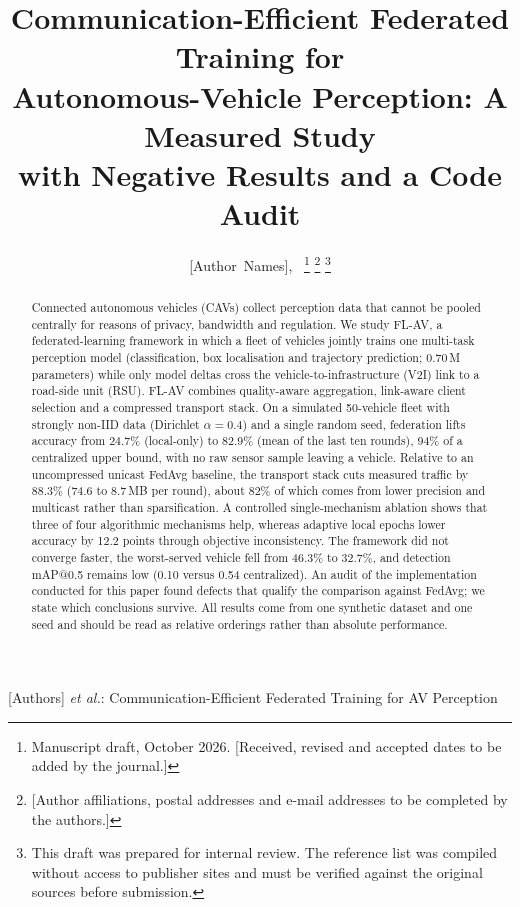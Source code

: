 \documentclass[journal]{IEEEtran}
\begin{document}
\title{Communication-Efficient Federated Training for\\ Autonomous-Vehicle Perception: A Measured Study\\ with Negative Results and a Code Audit}

\author{[Author~Names],~%
\thanks{Manuscript draft, October 2026. [Received, revised and accepted dates to be added by the journal.]}%
\thanks{[Author affiliations, postal addresses and e-mail addresses to be completed by the authors.]}%
\thanks{This draft was prepared for internal review. The reference list was compiled without access to publisher sites and must be verified against the original sources before submission.}}

%
{[Authors] \MakeLowercase{\textit{et al.}}: Communication-Efficient Federated Training for AV Perception}

\maketitle

\begin{abstract}
Connected autonomous vehicles (CAVs) collect perception data that cannot be pooled centrally for reasons of privacy, bandwidth and regulation. We study FL-AV, a federated-learning framework in which a fleet of vehicles jointly trains one multi-task perception model (classification, box localisation and trajectory prediction; 0.70\,M parameters) while only model deltas cross the vehicle-to-infrastructure (V2I) link to a road-side unit (RSU). FL-AV combines quality-aware aggregation, link-aware client selection and a compressed transport stack. On a simulated 50-vehicle fleet with strongly non-IID data (Dirichlet $\alpha=0.4$) and a single random seed, federation lifts accuracy from 24.7\% (local-only) to 82.9\% (mean of the last ten rounds), 94\% of a centralized upper bound, with no raw sensor sample leaving a vehicle. Relative to an uncompressed unicast FedAvg baseline, the transport stack cuts measured traffic by 88.3\% (74.6 to 8.7\,MB per round), about 82\% of which comes from lower precision and multicast rather than sparsification. A controlled single-mechanism ablation shows that three of four algorithmic mechanisms help, whereas adaptive local epochs lower accuracy by 12.2 points through objective inconsistency. The framework did not converge faster, the worst-served vehicle fell from 46.3\% to 32.7\%, and detection mAP@0.5 remains low (0.10 versus 0.54 centralized). An audit of the implementation conducted for this paper found defects that qualify the comparison against FedAvg; we state which conclusions survive. All results come from one synthetic dataset and one seed and should be read as relative orderings rather than absolute performance.
\end{abstract}
\end{document}
